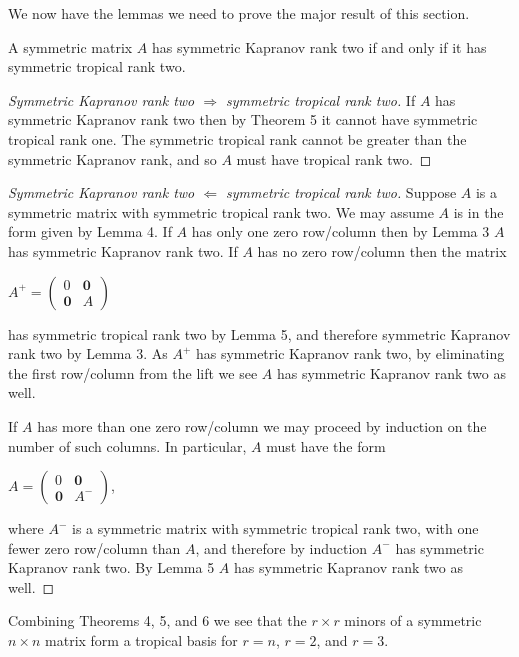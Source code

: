 \documentclass{article}
\begin{document}
We now have the lemmas we need to prove the major result of this section.

\begin{thm}
  A symmetric matrix $A$ has symmetric Kapranov rank two if and only if it has symmetric tropical rank two.
\end{thm}

\begin{proof}[Symmetric Kapranov rank two $\Rightarrow$ symmetric tropical rank two]
  If $A$ has symmetric Kapranov rank two then by Theorem 5 it cannot have symmetric tropical rank one. The symmetric tropical rank cannot be greater than the symmetric Kapranov rank, and so $A$ must have tropical rank two.
\end{proof}

\begin{proof}[Symmetric Kapranov rank two $\Leftarrow$ symmetric tropical rank two]
  Suppose $A$ is a symmetric matrix with symmetric tropical rank two. We may assume $A$ is in the form given by Lemma 4. If $A$ has only one zero row/column then by Lemma 3 $A$ has symmetric Kapranov rank two. If $A$ has no zero row/column then the matrix
  \begin{center}
    $A^{+} = \left(\begin{array}{cc} 0 & \textbf{0} \\ \textbf{0} & A \end{array}\right)$
  \end{center}
  has symmetric tropical rank two by Lemma 5, and therefore symmetric Kapranov rank two by Lemma 3. As $A^{+}$ has symmetric Kapranov rank two, by eliminating the first row/column from the lift we see $A$ has symmetric Kapranov rank two as well.
  
  If $A$ has more than one zero row/column we may proceed by induction on the number of such columns. In particular, $A$ must have the form
  \begin{center}
    $A = \left(\begin{array}{cc} 0 & \textbf{0} \\ \textbf{0} & A^{-} \end{array}\right)$,
  \end{center}
  where $A^{-}$ is a symmetric matrix with symmetric tropical rank two, with one fewer zero row/column than $A$, and therefore by induction $A^{-}$ has symmetric Kapranov rank two. By Lemma 5 $A$ has symmetric Kapranov rank two as well.
\end{proof}

Combining Theorems 4, 5, and 6 we see that the $r \times r$ minors of a symmetric $n \times n$ matrix form a tropical basis for $r = n$, $r = 2$, and $r = 3$.
\end{document}
